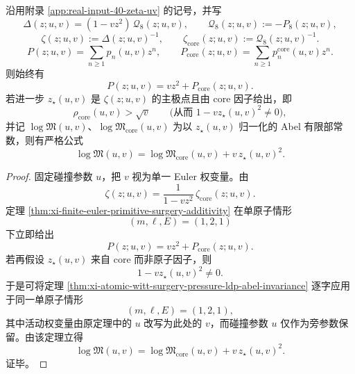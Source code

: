 \begin{theorem}\label{thm:conclusion-realinput40-uv-primitive-surgery-abel-shift}
沿用附录 \ref{app:real-input-40-zeta-uv} 的记号，并写
\[
\Delta(z;u,v)=(1-vz^2)\,\mathcal Q_8(z;u,v),
\qquad
\mathcal Q_8(z;u,v):=-P_8(z;u,v),
\]
\[
\zeta(z;u,v):=\Delta(z;u,v)^{-1},
\qquad
\zeta_{\mathrm{core}}(z;u,v):=\mathcal Q_8(z;u,v)^{-1}.
\]
\[
P(z;u,v)=\sum_{n\ge 1}p_n(u,v)z^n,
\qquad
P_{\mathrm{core}}(z;u,v)=\sum_{n\ge 1}p_n^{\mathrm{core}}(u,v)z^n.
\]
则始终有
\[
\boxed{\;
P(z;u,v)=vz^2+P_{\mathrm{core}}(z;u,v).\;}
\]
若进一步 \(z_\star(u,v)\) 是 \(\zeta(z;u,v)\) 的主极点且由 core 因子给出，即
\[
\rho_{\mathrm{core}}(u,v)>\sqrt v
\qquad
\bigl(\text{从而 }1-vz_\star(u,v)^2\neq 0\bigr),
\]
并记 \(\log\mathfrak M(u,v)\)、\(\log\mathfrak M_{\mathrm{core}}(u,v)\) 为以 \(z_\star(u,v)\) 归一化的 Abel 有限部常数，则有严格公式
\[
\boxed{\;
\log\mathfrak M(u,v)=\log\mathfrak M_{\mathrm{core}}(u,v)+v\,z_\star(u,v)^2.\;}
\]
\end{theorem}
\begin{proof}
固定碰撞参数 \(u\)，把 \(v\) 视为单一 Euler 权变量。由
\[
\zeta(z;u,v)=\frac{1}{1-vz^2}\,\zeta_{\mathrm{core}}(z;u,v).
\]
定理 \ref{thm:xi-finite-euler-primitive-surgery-additivity} 在单原子情形
\[
(m,\ell,E)=(1,2,1)
\]
下立即给出
\[
P(z;u,v)=vz^2+P_{\mathrm{core}}(z;u,v).
\]
若再假设 \(z_\star(u,v)\) 来自 core 而非原子因子，则
\[
1-vz_\star(u,v)^2\neq 0.
\]
于是可将定理 \ref{thm:xi-atomic-witt-surgery-pressure-ldp-abel-invariance} 逐字应用于同一单原子情形
\[
(m,\ell,E)=(1,2,1),
\]
其中活动权变量由原定理中的 \(u\) 改写为此处的 \(v\)，而碰撞参数 \(u\) 仅作为旁参数保留。由该定理立得
\[
\log\mathfrak M(u,v)=\log\mathfrak M_{\mathrm{core}}(u,v)+v\,z_\star(u,v)^2.
\]
证毕。
\end{proof}

